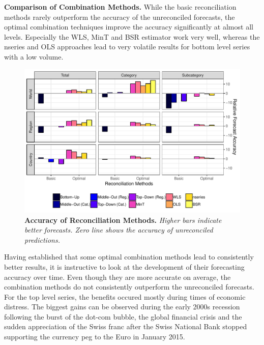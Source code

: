 \documentclass[a4paper,fleqn,11pt]{article}
\begin{document}
\noindent\textbf{Comparison of Combination Methods.} While the basic reconciliation methods rarely outperform the accuracy of the unreconciled forecasts, the optimal combination techniques improve the accuracy significantly at almost all levels. Especially the WLS, MinT and BSR estimator work very well, whereas the nseries and OLS approaches lead to very volatile results for bottom level series with a low volume.
 \begin{figure}[H]
	\includegraphics[width=\textwidth]{fig/fig_eval_rmse_relative}
	\caption[Accuracy of Reconciliation Methods]{\textbf{Accuracy of Reconciliation Methods.} \textit{Higher bars indicate better forecasts. Zero line shows the accuracy of unreconciled predictions.}} \label{fig:rmse}
\end{figure}
Having established that some optimal combination methods lead to consistently better results, it is instructive to look at the development of their forecasting accuracy over time. Even though they are more accurate on average, the combination methods do not consistently outperform the unreconciled forecasts. For the top level series, the benefits occured mostly during times of economic distress. The biggest gains can be observed during the early 2000s recession following the burst of the dot-com bubble, the global financial crisis and the sudden appreciation of the Swiss franc after the Swiss National Bank stopped supporting the currency peg to the Euro in January 2015.
\end{document}
